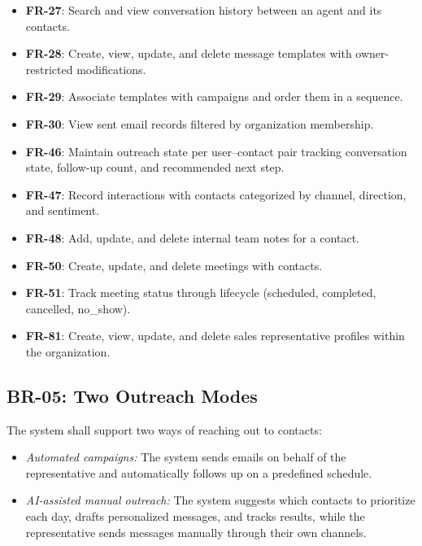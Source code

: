 \documentclass[a4paper]{article}
\begin{document}
\begin{itemize}
    \item \textbf{FR-27}: Search and view conversation history
    between an agent and its contacts.
    \item \textbf{FR-28}: Create, view, update, and delete message
    templates with owner-restricted modifications.
    \item \textbf{FR-29}: Associate templates with campaigns and
    order them in a sequence.
    \item \textbf{FR-30}: View sent email records filtered by
    organization membership.
    \item \textbf{FR-46}: Maintain outreach state per user--contact
    pair tracking conversation state, follow-up count, and
    recommended next step.
    \item \textbf{FR-47}: Record interactions with contacts
    categorized by channel, direction, and sentiment.
    \item \textbf{FR-48}: Add, update, and delete internal team
    notes for a contact.
    \item \textbf{FR-50}: Create, update, and delete meetings with
    contacts.
    \item \textbf{FR-51}: Track meeting status through lifecycle
    (scheduled, completed, cancelled, no\_show).
    \item \textbf{FR-81}: Create, view, update, and delete sales
    representative profiles within the organization.
\end{itemize}

\subsection{BR-05: Two Outreach Modes}

The system shall support two ways of reaching out to contacts:
\begin{itemize}
    \item \emph{Automated campaigns:} The system sends emails on
    behalf of the representative and automatically follows up on a
    predefined schedule.
    \item \emph{AI-assisted manual outreach:} The system suggests
    which contacts to prioritize each day, drafts personalized
    messages, and tracks results, while the representative sends
    messages manually through their own channels.
\end{itemize}
\end{document}
